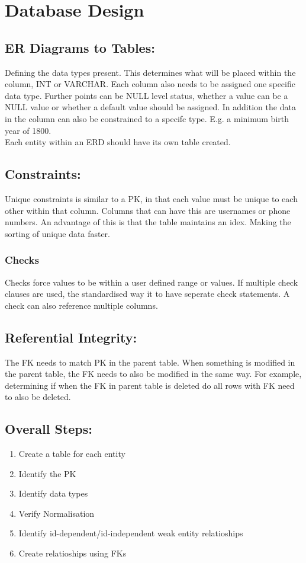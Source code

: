 \documentclass[a5paper]{article}
\begin{document}
	\section{Database Design}
	\subsection{ER Diagrams to Tables:}
	Defining the data types present. This determines what will be placed within the column, INT or VARCHAR. Each column also needs to be assigned one specific data type. Further points can be NULL level status, whether a value can be a NULL value or whether a default value should be assigned. In addition the data in the column can also be constrained to a specifc type. E.g. a minimum birth year of 1800.\\
	Each entity within an ERD should have its own table created.
	\subsection{Constraints:}
	Unique constraints is similar to a PK, in that each value must be unique to each other within that column. Columns that can have this are usernames or phone numbers. An advantage of this is that the table maintains an idex. Making the sorting of unique data faster.
	\subsubsection{Checks}
	Checks force values to be within a user defined range or values. If multiple check clauses are used, the standardised way it to have seperate check statements. A check can also reference multiple columns.
	\subsection{Referential Integrity:}
	The FK needs to match PK in the parent table. When something is modified in the parent table, the FK needs to also be modified in the same way. For example, determining if when the FK in parent table is deleted do all rows with FK need to also be deleted.
	\subsection{Overall Steps:}
	\begin{enumerate}
		\item Create a table for each entity
		\item Identify the PK
		\item Identify data types
		\item Verify Normalisation
		\item Identify id-dependent/id-independent weak entity relatioships
		\item Create relatioships using FKs
	\end{enumerate}
\end{document}
